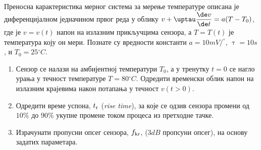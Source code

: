 \PID
Преносна карактеристика мерног система за мерење температуре описана је диференцијалном 
једначином првог реда у облику
$v + \uptau \dfrac{\de v}{\de t} = a(T - T_0)$, где је $v = v(t)$ напон на излазним прикључцима сензора, 
а $T = T(t)$ је температура коју он мери. Познате су вредности константи 
$a = 10\unit{mV/^\circ}$, $\uptau = 10\unit{s}$, и $T_0 = 25\unit{^\circ C}$.
\begin{enumerate}[label=(\alph*)]
\item Сензор се налази на амбијентној температури $T_0$, а у тренутку $t = 0$ се нагло урања 
у течност температуре $T = 80\unit{^\circ C}$.  
Одредити временски облик напон на излазним крајевима након потапања у течност $v(t > 0)$. 
\item Одредити време успона, $t_{\rm r}$ (\textit{rise time}), за које се одзив сензора промени од $10\%$ до 
$90\%$ укупне промене током процеса из претходне тачке.  
\item Израчунати пропусни опсег сензора, $f_{\rm kr}$, ($3\unit{dB}$ пропсуни опсег), на основу задатих параметара. 
\end{enumerate}

\RESENJE

